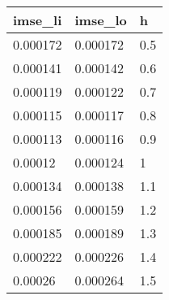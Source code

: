 \begin{tabular}{lll}
  \hline
imse\_li & imse\_lo & h \\ 
  \hline
0.000172 & 0.000172 & 0.5 \\ 
  0.000141 & 0.000142 & 0.6 \\ 
  0.000119 & 0.000122 & 0.7 \\ 
  0.000115 & 0.000117 & 0.8 \\ 
  0.000113 & 0.000116 & 0.9 \\ 
  0.00012 & 0.000124 & 1 \\ 
  0.000134 & 0.000138 & 1.1 \\ 
  0.000156 & 0.000159 & 1.2 \\ 
  0.000185 & 0.000189 & 1.3 \\ 
  0.000222 & 0.000226 & 1.4 \\ 
  0.00026 & 0.000264 & 1.5 \\ 
   \hline
\end{tabular}
